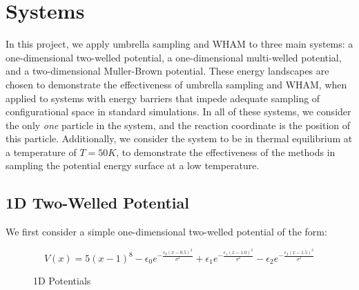 \documentclass{article}
\begin{document}
\section{Systems}
In this project, we apply umbrella sampling and WHAM to three main systems: a one-dimensional two-welled potential, a one-dimensional multi-welled potential, and a two-dimensional Muller-Brown potential. These energy landscapes are chosen to demonstrate the effectiveness of umbrella sampling and WHAM, when applied to systems with energy barriers that impede adequate sampling of configurational space in standard simulations. In all of these systems, we consider the only \textit{one} particle in the system, and the reaction coordinate is the position of this particle. Additionally, we consider the system to be in thermal equilibrium at a temperature of $T = 50K$, to demonstrate the effectiveness of the methods in sampling the potential energy surface at a low temperature.

\subsection{1D Two-Welled Potential}

We first consider a simple one-dimensional two-welled potential of the form:

$$
V(x) = 5(x-1)^8 - \epsilon_0 e^{-\frac{\epsilon_0(x-0.5)^2}{\sigma^2}} + \epsilon_1 e^{-\frac{\epsilon_1(x-1.0)^2}{\sigma^2}} - \epsilon_2 e^{-\frac{\epsilon_2(x-1.5)^2}{\sigma^2}}
$$

\begin{figure}%
    \centering
    \qquad
    \caption{1D Potentials}%
    \label{fig:1D_pots}%
\end{figure}
\end{document}
